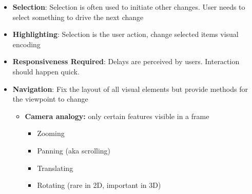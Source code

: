 \documentclass{report}
\begin{document}
\begin{itemize}
\begin{enumerate}
                    \begin{itemize}
                        \item Use consistent semantic-syntactic mappings
                        \item Respect semantic correspondence
                        \item Avoid ambiguity
                    \end{itemize}
                \item \textbf{Apprehension (Effectiveness):}
                    \begin{itemize}
                        \item Group similar transitions
                        \item Minimize occlusion
                        \item Maximize predictability
                        \item Use simple transitions
                        \item Use staging for complex transitions
                        \item Transitions as long as needed, but no longer
                    \end{itemize}
            \end{enumerate}
        \item \textbf{Selection}: Selection is often used to initiate other changes. User needs to select something to drive the next change
        \item \textbf{Highlighting}: Selection is the user action, change selected items visual encoding
        \item \textbf{Responsiveness Required}: Delays are perceived by users. Interaction should happen quick.
        \item \textbf{Navigation}: Fix the layout of all visual elements but provide methods for the viewpoint to change
            \begin{itemize}
                \item \textbf{Camera analogy:} only certain features visible in a frame
                    \begin{itemize}
                        \item Zooming
                        \item Panning (aka scrolling)
                        \item Translating
                        \item Rotating (rare in 2D, important in 3D)
                    \end{itemize}
            \end{itemize}




    \end{itemize}
\end{document}
